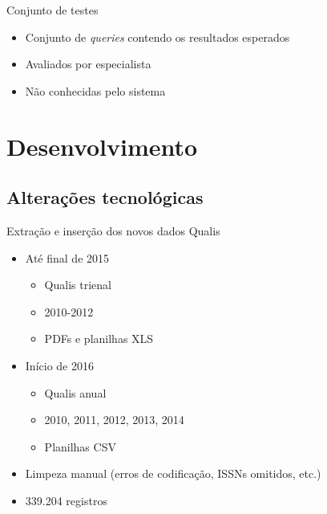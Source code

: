 \documentclass{beamer}
\begin{document}
\begin{frame}{Conjunto de testes}
  \begin{itemize}
    \item Conjunto de \textit{queries} contendo os resultados esperados
    \item Avaliados por especialista
    \item Não conhecidas pelo sistema
  \end{itemize}
\end{frame}

\section{Desenvolvimento}

\subsection{Alterações tecnológicas}

\begin{frame}{Extração e inserção dos novos dados Qualis}
  \begin{itemize}
    \item Até final de 2015
    \begin{itemize}
      \item Qualis trienal
      \item 2010-2012
      \item PDFs e planilhas XLS
    \end{itemize}

    \item Início de 2016
      \begin{itemize}
        \item Qualis anual
        \item 2010, 2011, 2012, 2013, 2014
        \item Planilhas CSV
      \end{itemize}

    \item Limpeza manual (erros de codificação, ISSNs omitidos, etc.)
    \item 339.204 registros
  \end{itemize}
\end{frame}
\end{document}

